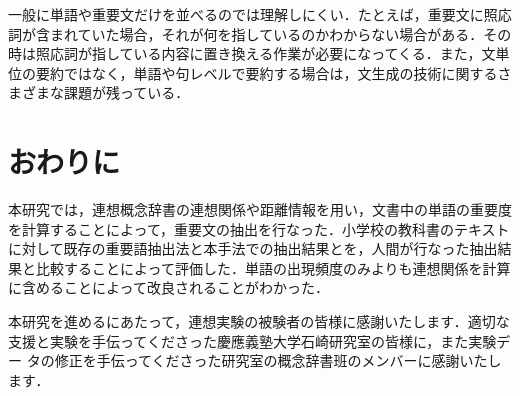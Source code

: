 一般に単語や重要文だけを並べるのでは理解しにくい．たとえば，重要文に照応詞が含まれていた場合，それが何を指しているのかわからない場合がある．その時は照応詞が指している内容に置き換える作業が必要になってくる．また，文単位の要約ではなく，単語や句レベルで要約する場合は，文生成の技術に関するさまざまな課題が残っている．

\vspace*{1.8cm}

\section{おわりに}

本研究では，連想概念辞書の連想関係や距離情報を用い，文書中の単語の重要度を計算することによって，重要文の抽出を行なった．小学校の教科書のテキストに対して既存の重要語抽出法と本手法での抽出結果とを，人間が行なった抽出結果と比較することによって評価した．単語の出現頻度のみよりも連想関係を計算に含めることによって改良されることがわかった．



\acknowledgment


本研究を進めるにあたって，連想実験の被験者の皆様に感謝いたします．適切な
支援と実験を手伝ってくださった慶應義塾大学石崎研究室の皆様に，また実験デー
タの修正を手伝ってくださった研究室の概念辞書班のメンバーに感謝いたします．






\begin{biography}


\end{biography}


